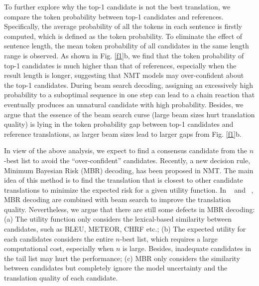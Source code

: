 \documentclass{article}
\begin{document}
To further explore why the top-1 candidate is not the best translation, we compare the token probability between top-1 candidates and references. Specifically, the average probability of all the tokens in each sentence is firstly computed, which is defined as the token probability. To eliminate the effect of sentence length, the mean token probability of all candidates in the same length range is observed. As shown in Fig. \ref{f1}b, we find that the token probability of top-1 candidates is much higher than that of references, especially when the result length is longer, suggesting that NMT models may over-confident about the top-1 candidates. During beam search decoding, assigning an excessively high probability to a suboptimal sequence in one step can lead to a chain reaction that eventually produces an unnatural candidate with high probability. Besides, we argue that the essence of the beam search curse \cite{45} (large beam sizes hurt translation quality) is lying in the token probability gap between top-1 candidates and reference translations, as larger beam sizes lead to larger gaps from Fig. \ref{f1}b.

In view of the above analysis, we expect to find a consensus candidate from the $n$-best list to avoid the ``over-confident'' candidates. %
Recently, a new decision rule, Minimum Bayesian Risk (MBR) decoding, has been proposed in NMT. The main idea of this method is to find the translation that is closest to other candidate translations to minimize the expected risk for a given utility function.
In \citeauthor{14}~ and \citeauthor{20}~, MBR decoding are combined with beam search to improve the translation quality. Nevertheless, we argue that there are still some defects in MBR decoding: (a) The utility function only considers the lexical-based similarity between candidates, such as BLEU, METEOR, CHRF etc.; (b) The expected utility for each candidates considers the entire $n$-best list, which requires a large computational cost, especially when $n$ is large. Besides, inadequate candidates in the tail list may hurt the performance; (c) MBR only considers the similarity between candidates but completely ignore the model uncertainty and the translation quality of each candidate.
\end{document}
